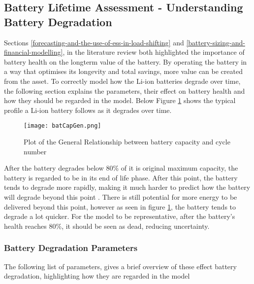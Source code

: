 \subsection{Battery Lifetime Assessment - Understanding Battery
Degradation}\label{battery-lifetime-assessment---understanding-battery-degradation}

Sections \ref{forecasting-and-the-use-of-ess-in-load-shifting} and
\ref{battery-sizing-and-financial-modelling}, in the literature review
both highlighted the importance of battery health on the longterm value
of the battery. By operating the battery in a way that optimises its
longevity and total savings, more value can be created from the asset.
To correctly model how the Li-ion batteries degrade over time, the
following section explains the parameters, their effect on battery
health and how they should be regarded in the model. Below Figure
\ref{batCapGen} shows the typical profile a Li-ion battery follows as it
degrades over time.

\begin{figure}[H]
  \centering
  \texttt{[image: batCapGen.png]}
  \caption{Plot of the General Relationship between battery capacity and cycle number \cite{spotnitz2003simulation} }
  \label{batCapGen}
\end{figure}

After the battery degrades below 80\% of it is original maximum
capacity, the battery is regarded to be in its end of life phase. After
this point, the battery tends to degrade more rapidly, making it much
harder to predict how the battery will degrade beyond this point
\cite{spotnitz2003simulation}. There is still potential for more energy
to be delivered beyond this point, however as seen in figure
\ref{batCapGen}, the battery tends to degrade a lot quicker. For the
model to be representative, after the battery's health reaches 80\%, it
should be seen as dead, reducing uncertainty.

\subsubsection{Battery Degradation
Parameters}\label{battery-degradation-parameters}

The following list of parameters, gives a brief overview of these effect
battery degradation, highlighting how they are regarded in the model

